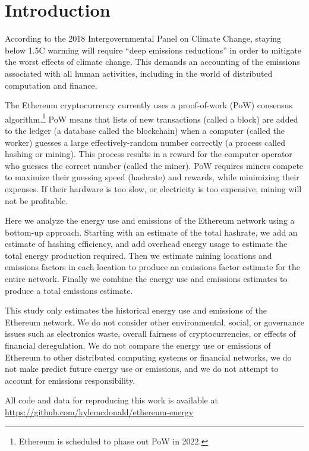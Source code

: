 
\section{Introduction}

According to the 2018 Intergovernmental Panel on Climate Change\cite{ipcc_annex_2014}, staying below 1.5{\textdegree}C warming will require ``deep emissions reductions'' in order to mitigate the worst effects of climate change. This demands an accounting of the emissions associated with all human activities, including in the world of distributed computation and finance.

The Ethereum cryptocurrency currently uses a proof-of-work (PoW) consensus algorithm.\footnote{Ethereum is scheduled to phase out PoW in 2022.} PoW means that lists of new transactions (called a block) are added to the ledger (a database called the blockchain) when a computer (called the worker) guesses a large effectively-random number correctly (a process called hashing or mining). This process results in a reward for the computer operator who guesses the correct number (called the miner). PoW requires miners compete to maximize their guessing speed (hashrate) and rewards, while minimizing their expenses. If their hardware is too slow, or electricity is too expensive, mining will not be profitable.

Here we analyze the energy use and emissions of the Ethereum network using a bottom-up approach. Starting with an estimate of the total hashrate, we add an estimate of hashing efficiency, and add overhead energy usage to estimate the total energy production required. Then we estimate mining locations and emissions factors in each location to produce an emissions factor estimate for the entire network. Finally we combine the energy use and emissions estimates to produce a total emissions estimate. %

This study only estimates the historical energy use and emissions of the Ethereum network. We do not consider other environmental, social, or governance issues\cite{vries_true_2021} such as electronics waste, overall fairness of cryptocurrencies, or effects of financial deregulation. We do not compare the energy use or emissions of Ethereum to other distributed computing systems or financial networks, we do not make predict future energy use or emissions, and we do not attempt to account for emissions responsibility.

All code and data for reproducing this work is available at \url{https://github.com/kylemcdonald/ethereum-energy}

